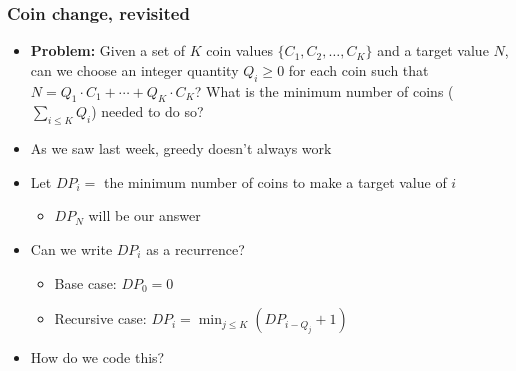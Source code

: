 \documentclass[t]{beamer}
\begin{document}
\begin{frame}

    \frametitle{Coin change, revisited}

    \begin{itemize}

        \item

        \textbf{Problem:} Given a set of $K$ coin values $\{C_1, C_2, \dots, C_K\}$ and a target value $N$, can we choose an integer quantity $Q_i \geq 0$ for each coin such that $N = Q_1 \cdot C_1 + \cdots + Q_K \cdot C_K$? \pause What is the minimum number of coins ($\sum_{i \leq K} Q_i$) needed to do so?

        \pause

        \item

        As we saw last week, greedy doesn't always work

        \pause

        \item

        Let $DP_i = $ the minimum number of coins to make a target value of $i$

        \pause

        \begin{itemize}

            \item

            $DP_N$ will be our answer

        \end{itemize}

        \pause

        \item

        Can we write $DP_i$ as a recurrence?

        \pause

        \begin{itemize}

            \item

            Base case: $DP_0 = 0$

            \item

            Recursive case: $DP_i = \min_{j \leq K}(DP_{i - Q_j} + 1)$

        \end{itemize}

        \pause

        \item

        How do we code this?

    \end{itemize}

\end{frame}
\end{document}
